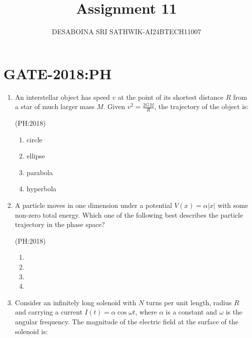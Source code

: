 \documentclass[journal,12pt,onecolumn]{IEEEtran}
\theoremstyle{remark}
\begin{document}

\vspace{3cm}

\title{Assignment 11}
\author{DESABOINA SRI SATHWIK-AI24BTECH11007}
\maketitle
\bigskip

\section*{GATE-2018:PH}
\begin{enumerate}
    \item An interstellar object has speed $v$ at the point of its shortest distance $R$ from a star of much larger mass $M$. Given $v^2 = \frac{2GM}{R}$, the trajectory of the object is:

    \hfill{(PH:2018)}
		\begin{multicols}{4}
    \begin{enumerate}
        \item circle
        \item ellipse
        \item parabola
        \item hyperbola
    \end{enumerate}
		\end{multicols}
   

    \item A particle moves in one dimension under a potential $V(x) = \alpha |x|$ with some non-zero total energy. Which one of the following best describes the particle trajectory in the phase space?

    \hfill{(PH:2018)}
		\begin{multicols}{2}
    \begin{enumerate}
	    \item 
        \item 
        \item 
        \item 
    \end{enumerate}
			\end{multicols}
    

    \item Consider an infinitely long solenoid with $N$ turns per unit length, radius $R$ and carrying a current $I(t) = \alpha \cos \omega t$, where $\alpha$ is a constant and $\omega$ is the angular frequency. The magnitude of the electric field at the surface of the solenoid is:


\end{enumerate}
\end{document}
